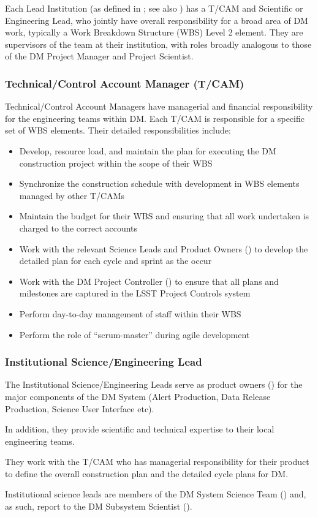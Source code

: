Each Lead Institution (as defined in ; see also ) has a T/CAM and Scientific or Engineering Lead, who jointly have overall responsibility for a broad area of DM work, typically a Work Breakdown Structure (WBS) Level 2 element. They are supervisors of the team at their institution, with roles broadly analogous to those of the DM Project Manager and Project Scientist.

\subsubsection{Technical/Control Account Manager (T/CAM) \label{role:tcam}}

Technical/Control Account Managers have managerial and financial responsibility
for the engineering teams within DM. Each T/CAM is responsible for a specific set of WBS elements. Their detailed responsibilities include:

\begin{itemize}

  \item{Develop, resource load, and maintain the plan for executing the DM construction project within the scope of their WBS}
  \item{Synchronize the construction schedule with development in WBS elements managed by other T/CAMs}
  \item{Maintain the budget for their WBS and ensuring that all work undertaken is charged to the correct accounts}
  \item{Work with the relevant Science Leads and Product Owners () to develop the detailed plan for each cycle and sprint as the occur}
  \item{Work with the DM Project Controller () to ensure that all plans and milestones are captured in the LSST Project Controls system}
  \item{Perform day-to-day management of staff within their WBS}
  \item{Perform the role of ``scrum-master'' during agile development}

\end{itemize}

\subsubsection{Institutional Science/Engineering Lead \label{role:scilead}}

The Institutional Science/Engineering Leads serve as product owners () for the major components of the DM System (Alert Production, Data Release Production, Science User Interface etc).

In addition, they provide scientific and technical expertise to their local engineering teams.

They work with the T/CAM who has managerial responsibility for their product to define the overall construction plan and the detailed cycle plans for DM.

Institutional science leads are members of the DM System Science Team () and, as such, report to the DM Subsystem Scientist ().

